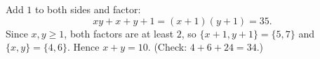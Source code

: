 Add $1$ to both sides and factor:
\[
xy+x+y+1=(x+1)(y+1)=35 .
\]
Since $x,y\ge1$, both factors are at least $2$, so $\{x+1,y+1\}=\{5,7\}$ and $\{x,y\}=\{4,6\}$. Hence $x+y=\boxed{10}$. (Check: $4+6+24=34$.)
